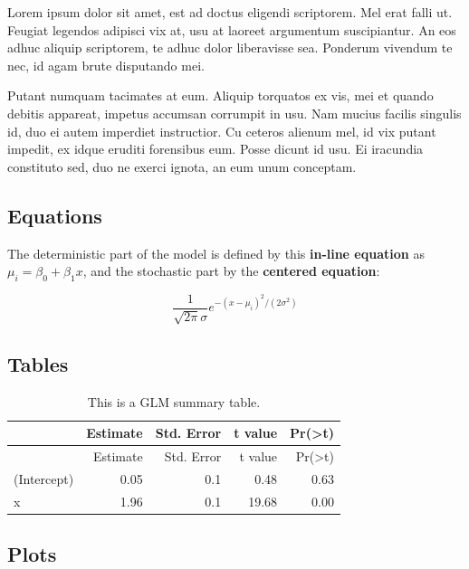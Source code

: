 \documentclass[]{article}
\begin{document}
Lorem ipsum dolor sit amet, est ad doctus eligendi scriptorem. Mel erat
falli ut. Feugiat legendos adipisci vix at, usu at laoreet argumentum
suscipiantur. An eos adhuc aliquip scriptorem, te adhuc dolor
liberavisse sea. Ponderum vivendum te nec, id agam brute disputando mei.

Putant numquam tacimates at eum. Aliquip torquatos ex vis, mei et quando
debitis appareat, impetus accumsan corrumpit in usu. Nam mucius facilis
singulis id, duo ei autem imperdiet instructior. Cu ceteros alienum mel,
id vix putant impedit, ex idque eruditi forensibus eum. Posse dicunt id
usu. Ei iracundia constituto sed, duo ne exerci ignota, an eum unum
conceptam.

\subsection{Equations}\label{equations}

The deterministic part of the model is defined by this \textbf{in-line
equation} as \(\mu_i = \beta_0 + \beta_1x\), and the stochastic part by
the \textbf{centered equation}:

\[ \frac{1}{\sqrt{2\pi}\sigma}e^{-(x-\mu_i)^2/(2\sigma^2)} \]

\subsection{Tables}\label{tables}

\begin{longtable}[]{@{}lrrrr@{}}
\caption{This is a GLM summary table.}\tabularnewline
\toprule
& Estimate & Std. Error & t value &
Pr(\textgreater{}\textbar{}t\textbar{})\tabularnewline
\midrule
\endfirsthead
\toprule
& Estimate & Std. Error & t value &
Pr(\textgreater{}\textbar{}t\textbar{})\tabularnewline
\midrule
\endhead
(Intercept) & 0.05 & 0.1 & 0.48 & 0.63\tabularnewline
x & 1.96 & 0.1 & 19.68 & 0.00\tabularnewline
\bottomrule
\end{longtable}

\subsection{Plots}\label{plots}
\end{document}
